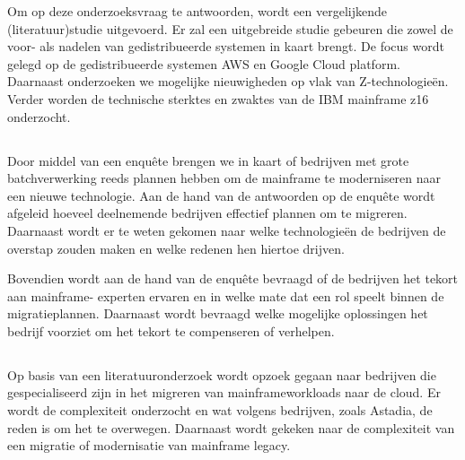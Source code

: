 Om op deze onderzoeksvraag te antwoorden, wordt een vergelijkende (literatuur)studie uitgevoerd. Er zal een uitgebreide studie gebeuren die zowel de voor- als nadelen van gedistribueerde systemen in kaart brengt. De focus wordt gelegd op de gedistribueerde systemen AWS en Google Cloud platform. Daarnaast onderzoeken we mogelijke nieuwigheden op vlak van Z-technologieën. Verder worden de technische sterktes en zwaktes van de IBM mainframe z16 onderzocht.

\subsection{}

Door middel van een enquête brengen we in kaart of bedrijven met grote batchverwerking reeds plannen hebben om de mainframe te moderniseren naar een nieuwe technologie. Aan de hand van de antwoorden op de enquête wordt afgeleid hoeveel deelnemende bedrijven effectief plannen om te migreren. Daarnaast wordt er te weten gekomen naar welke technologieën de bedrijven de overstap zouden maken en welke redenen hen hiertoe drijven.

Bovendien wordt aan de hand van de enquête bevraagd of de bedrijven het tekort aan mainframe- experten ervaren en in welke mate dat een rol speelt binnen de migratieplannen. Daarnaast wordt bevraagd welke mogelijke oplossingen het bedrijf voorziet om het tekort te compenseren of verhelpen.


\subsection{}

Op basis van een literatuuronderzoek wordt opzoek gegaan naar bedrijven die gespecialiseerd zijn in het migreren van mainframeworkloads naar de cloud. Er wordt de complexiteit onderzocht en wat volgens bedrijven, zoals Astadia, de reden is om het te overwegen. Daarnaast wordt gekeken naar de complexiteit van een migratie of modernisatie van mainframe legacy.
\newpage

